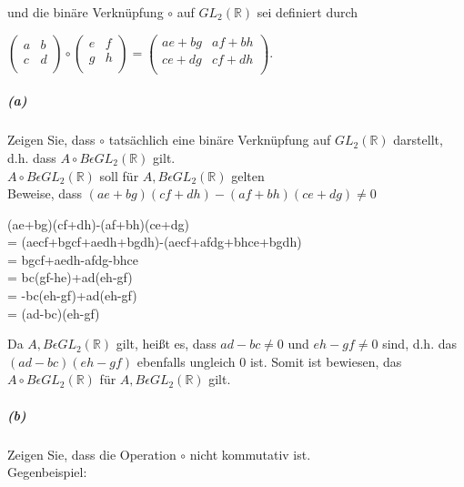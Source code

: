 \documentclass[paper=a4, fontsize=11pt]{scrartcl}
\numberwithin{equation}{section}
\numberwithin{figure}{section}
\numberwithin{table}{section}
\begin{document}
und die binäre Verknüpfung $\circ$ auf $GL_{2}(\mathbb{R})$ sei definiert durch

\begin{center}
$\begin{pmatrix}
a & b  \\
c & d  \\
\end{pmatrix} 
\circ
\begin{pmatrix}
e & f  \\
g & h  \\
\end{pmatrix}
=
\begin{pmatrix}
ae+bg & af+bh  \\
ce+dg & cf+dh  \\
\end{pmatrix}.$
\end{center}

\subparagraph{(a)} 
Zeigen Sie, dass $\circ$ tatsächlich eine binäre Verknüpfung auf $GL_{2}(\mathbb{R})$ darstellt, d.h. dass $A \circ B \epsilon GL_{2}(\mathbb{R})$ gilt.\\

$A \circ B \epsilon GL_{2}(\mathbb{R})$ soll für $A, B \epsilon GL_{2}(\mathbb{R})$ gelten \\
Beweise, dass $(ae+bg)(cf+dh)-(af+bh)(ce+dg) \neq 0$ 

\begin{flushleft}
(ae+bg)(cf+dh)-(af+bh)(ce+dg) \\
= (aecf+bgcf+aedh+bgdh)-(aecf+afdg+bhce+bgdh) \\
= bgcf+aedh-afdg-bhce \\
= bc(gf-he)+ad(eh-gf) \\
= -bc(eh-gf)+ad(eh-gf) \\
= (ad-bc)(eh-gf) \\
\end{flushleft}

Da $A, B \epsilon GL_{2}(\mathbb{R})$ gilt, heißt es, dass $ad-bc \neq 0$ und $eh-gf \neq 0$ sind, d.h. das $(ad-bc)(eh-gf)$ ebenfalls ungleich 0 ist. Somit ist bewiesen, das $A \circ B \epsilon GL_{2}(\mathbb{R})$ für $A, B \epsilon GL_{2}(\mathbb{R})$ gilt.


\subparagraph{(b)} 
Zeigen Sie, dass die Operation $\circ$ nicht kommutativ ist. \\

Gegenbeispiel: \\
\end{document}
